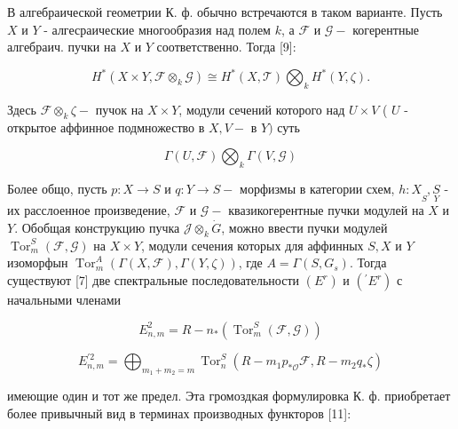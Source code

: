\documentclass[10pt]{article}
\begin{document}
В алгебраической геометрии К. ф. обычно встречаются в таком варианте. Пусть $X$ и $Y$ - алгесраические многообразия над полем $k$, а $\mathscr{F}$ и $\mathcal{G}-$ когерентные алгебраич. пучки на $X$ и $Y$ соответственно. Тогда [9]:



\[

H^{*}\left(X \times Y, \mathscr{F} \otimes_{k} \mathscr{G}\right) \cong H^{*}(X, \mathscr{T}) \bigotimes_{k} H^{*}(Y, \zeta) .

\]



Здесь $\mathscr{F} \otimes_{k} \zeta-$ пучок на $X \times Y$, модули сечений которого над $U \times V$ ( $U$ - открытое аффинное подмножество в $X, V-$ в $Y)$ суть



\[

\Gamma(U, \mathscr{F}) \bigotimes_{k} \Gamma(V, \mathscr{G})

\]



Более общо, пусть $p: X \rightarrow S$ и $q: Y \rightarrow S-$ морфизмы в категории схем, $h: X \underset{S}{ }, \underset{Y}{S}$ - их расслоенное произведение, $\mathscr{\mathcal { F }}$ и $\mathscr{G}-$ квазикогерентные пучки модулей на $X$ и $Y$. Обобщая конструкцию пучка $\mathscr{J} \otimes_{k} \dot{G}$, можно ввести пучки модулей $\operatorname{Tor}_{m}^{S}(\mathscr{F}, \mathscr{G})$ на $X \times Y$, модули сечения которых для аффинных $S, X$ и $Y$ изоморфын $\operatorname{Tor}_{m}^{A}(\Gamma(X, \mathscr{F}), \Gamma(Y, \zeta))$, где $A=\Gamma\left(S, G_{s}\right)$. Тогда существуют [7] две спектральные последовательности $\left(E^{r}\right)$ и $\left({ }^{\prime} E^{r}\right)$ с начальными членами



\[

E_{n, m}^{2}=R-n_{*}\left(\operatorname{Tor}_{m}^{S}(\mathscr{F}, \mathcal{G})\right)

\]



\[

E_{n, m}^{\prime 2}=\bigoplus_{m_{1}+m_{2}=m} \operatorname{Tor}_{n}^{S}\left(R-m_{1} p_{* \mathcal{O}} \mathcal{F}, R-m_{2} q_{*} \zeta\right)

\]



имеющие один и тот же предел. Эта громоздкая формулировка К. ф. приобретает более привычный вид в терминах производных функторов [11]:
\end{document}
